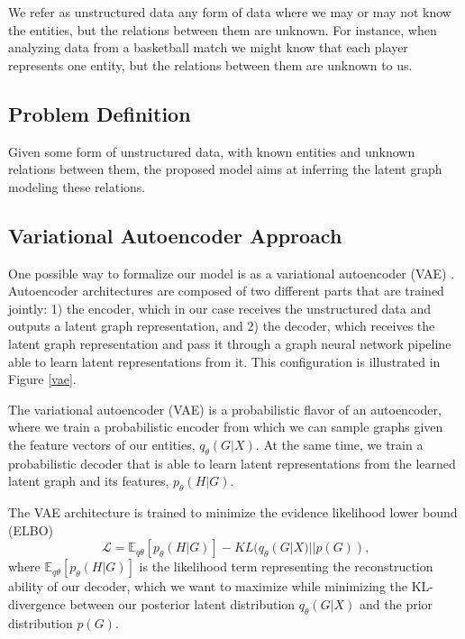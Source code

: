\documentclass[12pt,a4paper]{article}
\begin{document}
	We refer as unstructured data any form of data where we may or may not know the entities, but the relations between them are unknown. For instance, when analyzing data from a basketball match we might know that each player represents one entity, but the relations between them are unknown to us.
	
	\subsection{Problem Definition}
	
	Given some form of unstructured data, with known entities and unknown relations between them, the proposed model aims at inferring the latent graph modeling these relations.
	
	\subsection{Variational Autoencoder Approach}
	
	One possible way to formalize our model is as a variational autoencoder (VAE) \citep{KingmaandWelling2013, Rezende2014}. Autoencoder architectures are composed of two different parts that are trained jointly: 1) the encoder, which in our case receives the unstructured data and outputs a latent graph representation, and 2) the decoder, which receives the latent graph representation and pass it through a graph neural network pipeline able to learn latent representations from it. This configuration is illustrated in Figure \ref{vae}.
	
	The variational autoencoder (VAE) is a probabilistic flavor of an autoencoder, where we train a probabilistic encoder from which we can sample graphs given the feature vectors of our entities, $q_\theta (G|X)$. At the same time, we train a probabilistic decoder that is able to learn latent representations from the learned latent graph and its features, $p_\theta (H|G)$.
	
	The VAE architecture is trained to minimize the evidence likelihood lower bound (ELBO)
	\begin{equation}
		\mathscr{L} = \mathbb{E}_{q\theta} [ p_\theta(H|G)] - KL(q_\theta (G|X)||p(G)) \text{,}\label{ELBO}
	\end{equation}
	where $\mathbb{E}_{q\theta}[ p_\theta(H|G)]$ is the likelihood term representing the reconstruction ability of our decoder, which we want to maximize while minimizing the KL-divergence between our posterior latent distribution $q_\theta (G|X)$ and the prior distribution $p(G)$.
	
\end{document}
